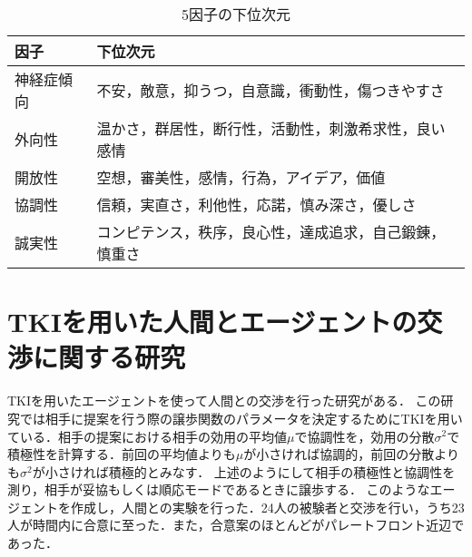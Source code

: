 \begin{table}[htb]
    \centering
    \caption{5因子の下位次元}
    \begin{tabular}{ll} \hline
        因子 & 下位次元 \\ \hline
        神経症傾向 & 不安，敵意，抑うつ，自意識，衝動性，傷つきやすさ \\
        外向性 & 温かさ，群居性，断行性，活動性，刺激希求性，良い感情 \\
        開放性 & 空想，審美性，感情，行為，アイデア，価値 \\
        協調性 & 信頼，実直さ，利他性，応諾，慎み深さ，優しさ \\
        誠実性 & コンピテンス，秩序，良心性，達成追求，自己鍛錬，慎重さ \\ \hline
    \end{tabular}
    \label{tab:neo-pi-r}
\end{table}

\section{TKIを用いた人間とエージェントの交渉に関する研究}
TKIを用いたエージェントを使って人間との交渉を行った研究がある\cite{tki-ha}．
この研究では相手に提案を行う際の譲歩関数のパラメータを決定するためにTKIを用いている．相手の提案における相手の効用の平均値$\mu$で協調性を，効用の分散$\sigma^2$で積極性を計算する．前回の平均値よりも$\mu$が小さければ協調的，前回の分散よりも$\sigma^2$が小さければ積極的とみなす．
上述のようにして相手の積極性と協調性を測り，相手が妥協もしくは順応モードであるときに譲歩する．
このようなエージェントを作成し，人間との実験を行った．24人の被験者と交渉を行い，うち23人が時間内に合意に至った．また，合意案のほとんどがパレートフロント近辺であった．

